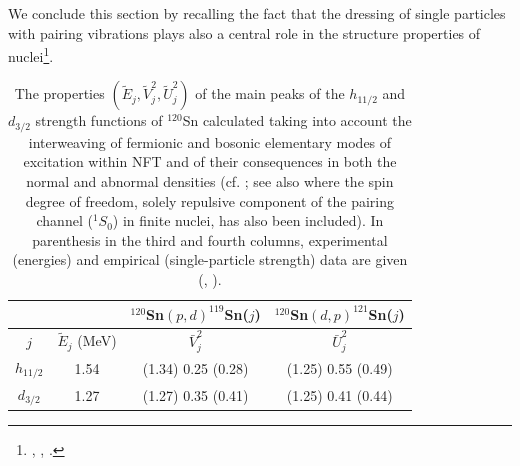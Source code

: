   
  We conclude this section by recalling the fact that the dressing of single particles with pairing vibrations plays also a central role in the structure properties of nuclei\footnote{\cite{Barranco:87b}, \cite{Bes:88}, \cite{Baroni:04}.}.
  
  
  \begin{table}
  \centering
  \begin{tabular}{|c|c|c|c|}
  \hline  &  & $^{120}$Sn$(p,d)^{119}$Sn($j$) & $^{120}$Sn$(d,p)^{121}$Sn($j$) \\ 
  \hline $j$ & $\tilde E_j$ (MeV) & $\bar V_j^2$ & $\bar U_j^2$ \\ 
  \hline $h_{11/2}$ & 1.54 &  (1.34) 0.25 (0.28) & (1.25) 0.55 (0.49) \\ 
  \hline $d_{3/2}$ & 1.27  & (1.27) 0.35 (0.41) & (1.25) 0.41 (0.44)  \\ 
  \hline 
  \end{tabular}\caption{The properties $(\tilde E_j,\tilde V^2_j, \tilde U_j^2)$ of the main peaks of the $h_{11/2}$ and $d_{3/2}$ strength functions of $^{120}$Sn calculated taking into account the interweaving of fermionic and bosonic elementary modes of excitation within NFT and of their consequences in both the normal and abnormal densities (cf. \cite{Idini:12}; \cite{Idini:13} see also \cite{Idini:15} where the spin degree of freedom, solely repulsive component of the pairing channel ($^1S_0$) in finite nuclei, has also been included). In parenthesis in the third and fourth columns, experimental (energies) and empirical (single-particle strength) data are given (\cite{Bechara:75}, \cite{Dickey:82}).}\label{tab6.2.1}
  \end{table}

